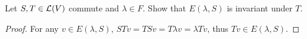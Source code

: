 \documentclass[../main.tex]{subfiles}
\begin{document}
\setcounter{theorem}{74}
\begin{theorem}
  Let $S, T \in \mathcal{L}(V)$ commute and $\lambda \in F$.
  Show that $E(\lambda, S)$ is invariant under $T$.
\end{theorem}
\begin{proof}
  For any $v \in E(\lambda, S)$,
  $STv = TSv = T \lambda v = \lambda Tv$, thus $Tv \in E(\lambda, S)$.
\end{proof}
\end{document}
